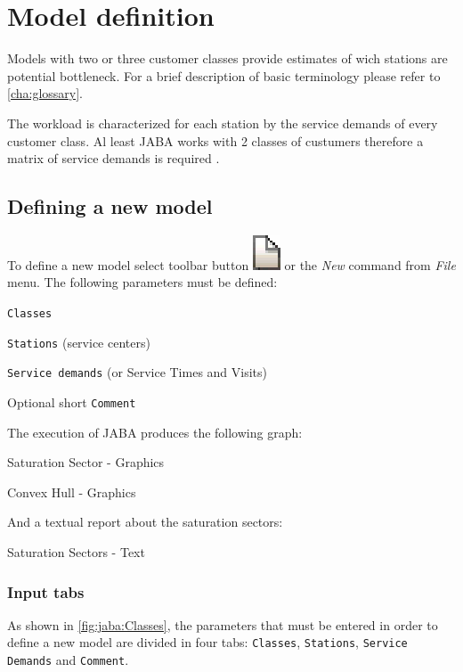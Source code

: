 \section{Model definition}
Models with two or three customer classes provide estimates of wich stations are potential bottleneck.
For a brief description of basic terminology please refer to \autoref{cha:glossary}.

The workload is characterized for each station by the service
demands of every customer class.
Al least JABA works with 2 classes of custumers therefore a matrix of
service demands is required \cite{Lazowska}.

\subsection{Defining a new model}
To define a new model select toolbar button
\includegraphics[scale=.8]{img/jaba/new} or the \emph{New} command
from \emph{File} menu. The following parameters must be defined:
\begin{enumerate*}
\item \texttt{Classes}
\item \texttt{Stations} (service centers)
\item \texttt{Service demands} (or Service Times and Visits)
\item Optional short \texttt{Comment}
\end{enumerate*}

The execution of JABA produces the following graph:

\begin{itemize*}
\item Saturation Sector - Graphics
\item Convex Hull - Graphics
\end{itemize*}

\noindent And a textual report about the saturation sectors:
\begin{itemize*}
\item Saturation Sectors - Text
\end{itemize*}

\subsubsection{Input tabs}
As shown in \autoref{fig:jaba:Classes}, the parameters that
must be entered in order to define a new model are divided in four
tabs: \texttt{Classes}, \texttt{Stations}, \texttt{Service Demands}
and \texttt{Comment}.

